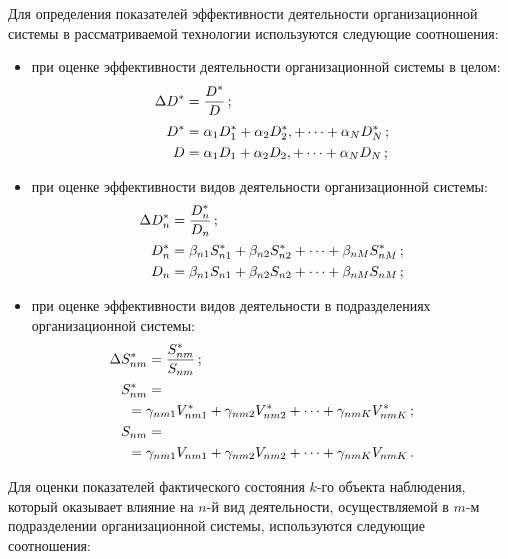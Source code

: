 \begin{multicols}{2}
     Для определения показателей эффективности деятельности организационной
системы в рас\-смат\-ри\-ва\-емой технологии используются следующие соотношения:
     \begin{itemize}
\item при оценке эффективности деятельности организационной системы в целом:
\begin{align*}
\Delta D^* &= \fr{D^*}{ D}\,;\\ %
D^*& = \alpha_1D^*_1 + \alpha_2D^*_2, +\cdots + \alpha_ND^*_N\,;\\ %
      D &= \alpha_1D_1 + \alpha_2D_2, +\cdots+ \alpha_ND_N\,;
      \end{align*}
      \item при оценке эффективности видов деятельности
организационной системы:
      \begin{align*}
      \Delta D^*_n&= \fr{D^*_n}{D_n}\,;\\ %
D^*_n &= \beta_{n1}S^*_{n1} +\beta_{n2}S^*_{n2} +\cdots+ \beta_{nM}S^*_{nM}\,;
\\
      D_n &= \beta_{n1}S_{n1} + \beta_{n2}S_{n2} +\cdots+
\beta_{nM}S_{nM}\,;
      \end{align*}
      \item при оценке эффективности видов деятельности в
подразделениях организационной системы:
\begin{align*}
    \hspace*{-5mm}  \Delta S^*_{nm} & = \fr{S^*_{nm}}{ S_{nm}}\,;\\
    \hspace*{-5mm} S^*_{nm}& ={}\\
&   \hspace*{-5mm}  {}= \gamma_{nm1}V^*_{nm1} + \gamma_{nm2}V^*_{nm2}
+\cdots + \gamma_{nmK}V^*_{nmK}\,;
\\
\hspace*{-5mm}S_{nm} & = {}\\
&\hspace*{-5mm}{}=\gamma_{nm1}V_{nm1} + \gamma_{nm2}V_{nm2}
+\cdots+ \gamma_{nmK}V_{nmK}\,.
\end{align*}
\end{itemize}
Для оценки показателей фактического состояния $k$-го объекта наблюдения,
который оказывает влияние на $n$-й вид деятельности, осуществляемой в $m$-м
подразделении организационной системы, используются следующие соотношения:

\end{multicols}

